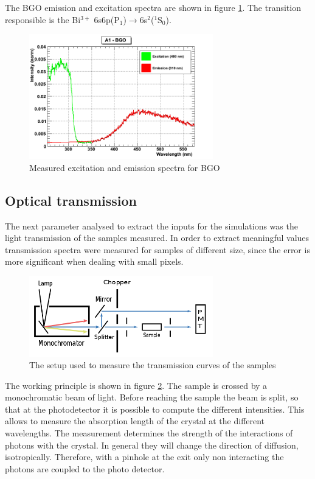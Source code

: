The BGO emission and excitation spectra are shown in figure \ref{fig:BGO}. The transition responsible is the Bi$^{3+}$ 6s6p(P$_{1}$)$\rightarrow$6s$^{2}$($^{1}$S$_{0}$).

\begin{figure}[htbp]
\begin{center}
\includegraphics[width=8cm]{../Pictures/Chapter_5/BGO.png}
\end{center}
\caption[BGO excitation/emission]{Measured excitation and emission spectra for BGO}
\label{fig:BGO}
\end{figure}

\subsection{Optical transmission}
The next parameter analysed to extract the inputs for the simulations was the light transmission of the samples measured.
In order to extract meaningful values transmission spectra were measured for samples of different size, since the error is more significant when dealing with small pixels.
\begin{figure}[htbp]
\begin{center}
\includegraphics[width=8cm]{../Pictures/Chapter_5/trans.png}
\end{center}
\caption[Spectro photometer]{The setup used to measure the transmission curves of the samples}
\label{fig:transmission}
\end{figure}
The working principle is shown in figure \ref{fig:transmission}. The sample is crossed by a monochromatic beam of light. Before reaching the sample the beam is split, so that at the photodetector it is possible to compute the different intensities. This allows to measure the absorption length of the crystal at the different wavelengths.
The measurement determines the strength of the interactions of photons with the crystal. In general they will change the direction of diffusion, isotropically. Therefore, with a pinhole at the exit only non interacting the photons are coupled to the photo detector.

